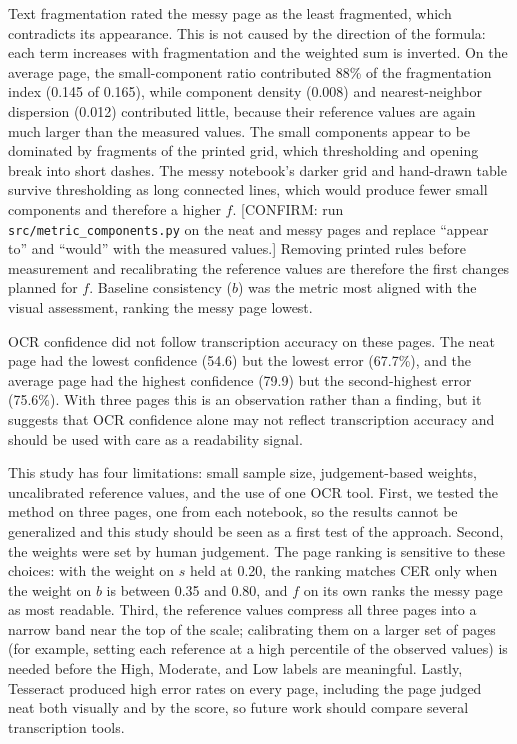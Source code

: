 Text fragmentation rated the messy page as the least fragmented, which
contradicts its appearance. This is not caused by the direction of the
formula: each term increases with fragmentation and the weighted sum is
inverted. On the average page, the small-component ratio contributed 88\% of
the fragmentation index (0.145 of 0.165), while component density (0.008) and
nearest-neighbor dispersion (0.012) contributed little, because their
reference values are again much larger than the measured values. The small
components appear to be dominated by fragments of the printed grid, which
thresholding and opening break into short dashes. The messy notebook's darker
grid and hand-drawn table survive thresholding as long connected lines, which
would produce fewer small components and therefore a higher $f$.
[CONFIRM: run \texttt{src/metric\_components.py} on the neat and messy pages and
replace ``appear to'' and ``would'' with the measured values.] Removing
printed rules before measurement and recalibrating the reference values are
therefore the first changes planned for $f$. Baseline consistency ($b$) was
the metric most aligned with the visual assessment, ranking the messy page
lowest.

OCR confidence did not follow transcription accuracy on these pages. The
neat page had the lowest confidence (54.6) but the lowest error (67.7\%),
and the average page had the highest confidence (79.9) but the second-highest
error (75.6\%). With three pages this is an observation rather than a
finding, but it suggests that OCR confidence alone may not reflect
transcription accuracy and should be used with care as a readability signal.

This study has four limitations: small sample size, judgement-based weights,
uncalibrated reference values, and the use of one OCR tool. First, we tested the method on three pages, one from each notebook, so
the results cannot be generalized and this study should be seen as a first
test of the approach. Second, the weights were set by human judgement. The page ranking is sensitive to these choices: with the
weight on $s$ held at 0.20, the ranking matches CER only when the weight on
$b$ is between 0.35 and 0.80, and $f$ on its own ranks the messy page as most
readable. Third, the reference values compress all three pages into a narrow
band near the top of the scale; calibrating them on a larger set of pages
(for example, setting each reference at a high percentile of the observed
values) is needed before the High, Moderate, and Low labels are meaningful.
Lastly, Tesseract produced high error rates on every page, including the page
judged neat both visually and by the score, so future work should compare
several transcription tools.

